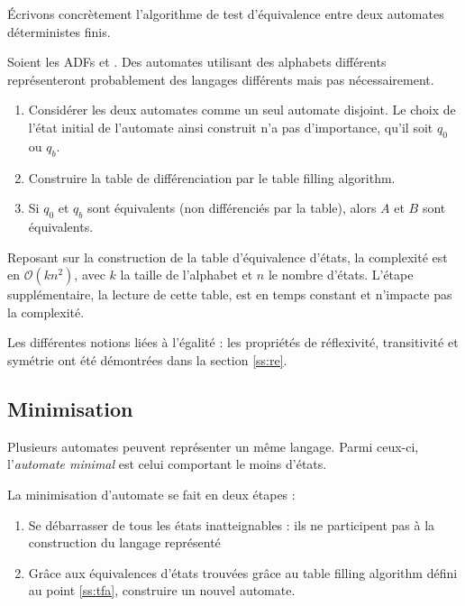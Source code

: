 Écrivons concrètement l'algorithme de test d'équivalence entre deux automates déterministes finis.
\begin{algo}\label{alg:eqauto}
  Soient les ADFs \automaton et \automatonbis. Des automates utilisant des alphabets différents représenteront probablement des langages différents mais pas nécessairement.
  \begin{enumerate}
    \item Considérer les deux automates comme un seul automate disjoint. Le choix de l'état initial de l'automate ainsi construit n'a pas d'importance, qu'il soit $q_0$ ou $q_b$.
    \item Construire la table de différenciation par le table filling algorithm.
    \item Si $q_0$ et $q_b$ sont équivalents (non différenciés par la table), alors $A$ et $B$ sont équivalents.
  \end{enumerate}

\end{algo}



\begin{complexity}
 Reposant sur la construction de la table d'équivalence d'états, la complexité est en $\mathcal{O}(kn^2)$, avec $k$ la taille de l'alphabet et $n$ le nombre d'états. L'étape supplémentaire, la lecture de cette table, est en temps constant et n'impacte pas la complexité.
\end{complexity}


Les différentes notions liées à l'égalité : les propriétés de réflexivité, transitivité et symétrie ont été démontrées dans la section \ref{ss:re}.



\subsection{Minimisation}\label{tfa:mini}

Plusieurs automates peuvent représenter un même langage. Parmi ceux-ci, l'\emph{automate minimal} est celui comportant le moins d'états.


La minimisation d'automate se fait en deux étapes :
\begin{enumerate}
 \item Se débarrasser de tous les états inatteignables : ils ne participent pas à la construction du langage représenté
 \item Grâce aux équivalences d'états trouvées grâce au table filling algorithm défini au point \ref{ss:tfa}, construire un nouvel automate.
\end{enumerate}

